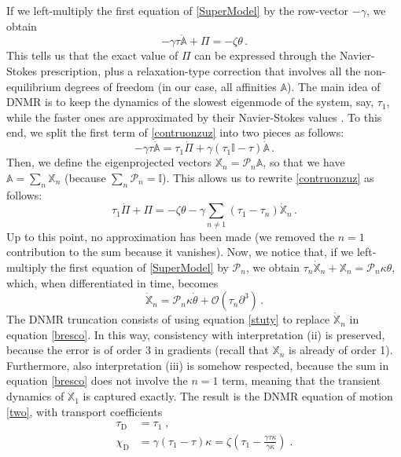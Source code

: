 \documentclass[a4paper, amsfonts, amssymb, amsmath, reprint, showkeys, nofootinbib, twoside, onecolumn,notitlepage]{revtex4-2}
\begin{document}
If we left-multiply the first equation of \eqref{SuperModel} by the row-vector $-\gamma$, we obtain
\begin{equation}\label{contruonzuz}
  -\gamma \tau \dot{\mathbb{A}}+\Pi =-\zeta \theta \, .  
\end{equation}
This tells us that the exact value of $\Pi$ can be expressed through the Navier-Stokes prescription, plus a relaxation-type correction that involves all the non-equilibrium degrees of freedom (in our case, all affinities $\mathbb{A}$). The main idea of DNMR is to keep the dynamics of the slowest eigenmode of the system, say, $\tau_1$, while the faster ones are approximated by their Navier-Stokes values \cite{Denicol2012Boltzmann}. To this end, we split the first term of \eqref{contruonzuz} into two pieces as follows:
\begin{equation}
   -\gamma \tau \dot{\mathbb{A}} = \tau_1 \dot{\Pi} + \gamma(\tau_1\mathbb{I}{-}\tau)\dot{\mathbb{A}} \, .   
\end{equation}
Then, we define the eigenprojected vectors $\mathbb{X}_n=\mathcal{P}_n \mathbb{A}$, so that we have $\mathbb{A}=\sum_n \mathbb{X}_n$ (because $\sum_n \mathcal{P}_n = \mathbb{I}$). This allows us to rewrite \eqref{contruonzuz} as follows:
\begin{equation}\label{bresco}
    \tau_1 \dot{\Pi}+\Pi = -\zeta \theta -\gamma \sum_{n \neq 1} (\tau_1{-}\tau_n)\dot{\mathbb{X}}_n \, .
\end{equation}
Up to this point, no approximation has been made (we removed the $n{=}1$ contribution to the sum because it vanishes). Now, we notice that, if we left-multiply the first equation of \eqref{SuperModel} by $\mathcal{P}_n$, we obtain $\tau_n\dot{\mathbb{X}}_n+\mathbb{X}_n=\mathcal{P}_n \kappa \theta$, which, when differentiated in time, becomes
\begin{equation}\label{stuty}
    \dot{\mathbb{X}}_n = \mathcal{P}_n \kappa \dot{\theta} + \mathcal{O}(\tau_n \partial^3) \, .
\end{equation}
The DNMR truncation consists of using equation \eqref{stuty} to replace $\dot{\mathbb{X}}_n$ in equation \eqref{bresco}. In this way, consistency with interpretation (ii) is preserved, because the error is of order 3 in gradients (recall that $\mathbb{X}_n$ is already of order 1). Furthermore, also interpretation (iii) is somehow respected, because the sum in equation \eqref{bresco} does not involve the $n=1$ term, meaning that the transient dynamics of $\mathbb{X}_1$ is captured exactly. The result is the DNMR equation of motion \eqref{two}, with transport coefficients
\begin{equation}\label{eqs:coeff_DNMR}
\begin{split}
\tau_{\text{D}} &=  \tau_1 \;, \\
\chi_{\text{D}} &=  \gamma(\tau_1{-}\tau)\kappa= \zeta \left(\tau_1-\frac{\gamma\tau \kappa}{\gamma\kappa}\right) \;.
\end{split}
\end{equation}
\end{document}
